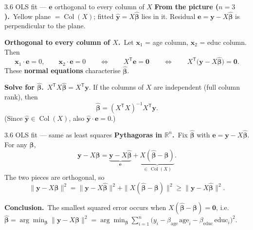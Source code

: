 \documentclass[11pt,aspectratio=169]{beamer}
\begin{document}
\begin{frame}{3.6 OLS fit --- $\mathbf{e}$ orthogonal to every column of $X$}
  \footnotesize
  \textbf{From the picture ($n=3$).}\
  Yellow plane $=\operatorname{Col}(X)$; fitted $\widehat{\mathbf{y}}=X\widehat{\boldsymbol{\beta}}$ lies in it.
  Residual $\mathbf{e}=\mathbf{y}-X\widehat{\boldsymbol{\beta}}$ is perpendicular to the plane.

  \medskip
  \textbf{Orthogonal to every column of $X$.}\
  Let $\mathbf{x}_1$ = age column, $\mathbf{x}_2$ = educ column. Then
  \[
    \mathbf{x}_1\cdot\mathbf{e}=0,
    \qquad
    \mathbf{x}_2\cdot\mathbf{e}=0
    \qquad\Longleftrightarrow\qquad
    X^{\mathsf T}\mathbf{e}=\mathbf{0}
    \qquad\Longleftrightarrow\qquad
    X^{\mathsf T}\bigl(\mathbf{y}-X\widehat{\boldsymbol{\beta}}\bigr)=\mathbf{0}.
  \]
  These \textbf{normal equations} characterise $\widehat{\boldsymbol{\beta}}$.

  \medskip
  \textbf{Solve for $\widehat{\boldsymbol{\beta}}$.}\
  $X^{\mathsf T}X\widehat{\boldsymbol{\beta}}=X^{\mathsf T}\mathbf{y}$. If the columns of $X$ are
  independent (full column rank), then
  \[
    \widehat{\boldsymbol{\beta}}=(X^{\mathsf T}X)^{-1}X^{\mathsf T}\mathbf{y}.
  \]
  {\scriptsize (Since $\widehat{\mathbf{y}}\in\operatorname{Col}(X)$, also $\widehat{\mathbf{y}}\cdot\mathbf{e}=0$.)}
\end{frame}

\begin{frame}{3.6 OLS fit --- same as least squares}
  \footnotesize
  \textbf{Pythagoras in $\mathbb{R}^n$.}\
  Fix $\widehat{\boldsymbol{\beta}}$ with $\mathbf{e}=\mathbf{y}-X\widehat{\boldsymbol{\beta}}$. For any $\boldsymbol{\beta}$,
  \[
    \mathbf{y}-X\boldsymbol{\beta}
    =\underbrace{\mathbf{y}-X\widehat{\boldsymbol{\beta}}}_{\mathbf{e}}
    +\underbrace{X(\widehat{\boldsymbol{\beta}}-\boldsymbol{\beta})}_{\in\,\operatorname{Col}(X)}.
  \]
  The two pieces are orthogonal, so
  \[
    \|\mathbf{y}-X\boldsymbol{\beta}\|^2
    =\|\mathbf{y}-X\widehat{\boldsymbol{\beta}}\|^2+\|X(\widehat{\boldsymbol{\beta}}-\boldsymbol{\beta})\|^2
    \ge \|\mathbf{y}-X\widehat{\boldsymbol{\beta}}\|^2.
  \]

  \medskip
  \textbf{Conclusion.}\
  The smallest squared error occurs when $X(\widehat{\boldsymbol{\beta}}-\boldsymbol{\beta})=\mathbf{0}$, i.e.\
  $\widehat{\boldsymbol{\beta}}=\arg\min_{\boldsymbol{\beta}}\|\mathbf{y}-X\boldsymbol{\beta}\|^2
  =\arg\min_{\boldsymbol{\beta}}\sum_{i=1}^n
  \bigl(y_i-\beta_{\text{age}}\,\text{age}_i-\beta_{\text{educ}}\,\text{educ}_i\bigr)^2$.
\end{frame}
\end{document}
